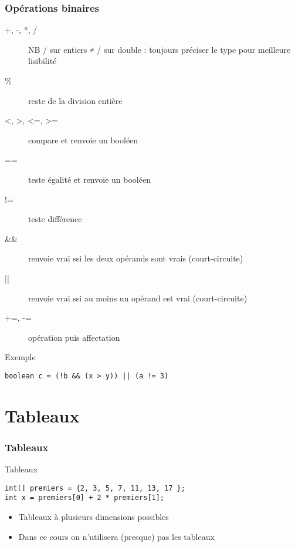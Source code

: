 \documentclass[english, french]{beamer}
\begin{document}
\begin{frame}[fragile]
	\frametitle{Opérations binaires}
	\begin{description}
		\item[+, -, *, /] NB / sur entiers ≠ / sur double : toujours préciser le type pour meilleure lisibilité
		\item[\%] reste de la division entière
		\item[<, >, <=, >=] compare et renvoie un booléen
		\item[==] teste égalité et renvoie un booléen
		\item[!=] teste différence
		\item[\&\&] renvoie vrai ssi les deux opérands sont vrais {\tiny (court-circuite)}
		\item[||] renvoie vrai ssi au moins un opérand est vrai {\tiny (court-circuite)}
		\item[+=, -=] opération puis affectation
	\end{description}
	\begin{block}{Exemple}
		\begin{lstlisting}
boolean c = (!b && (x > y)) || (a != 3)
		\end{lstlisting}	
	\end{block}
\end{frame}

\section{Tableaux}
\begin{frame}[fragile]
	\frametitle{Tableaux}
	\begin{block}{Tableaux}
		\begin{lstlisting}
int[] premiers = {2, 3, 5, 7, 11, 13, 17 };
int x = premiers[0] + 2 * premiers[1];
		\end{lstlisting}	
	\end{block}
	\begin{itemize}
		\item Tableaux à plusieurs dimensions possibles
		\item Dans ce cours on n’utilisera (presque) pas les tableaux
	\end{itemize}
\end{frame}
\end{document}
